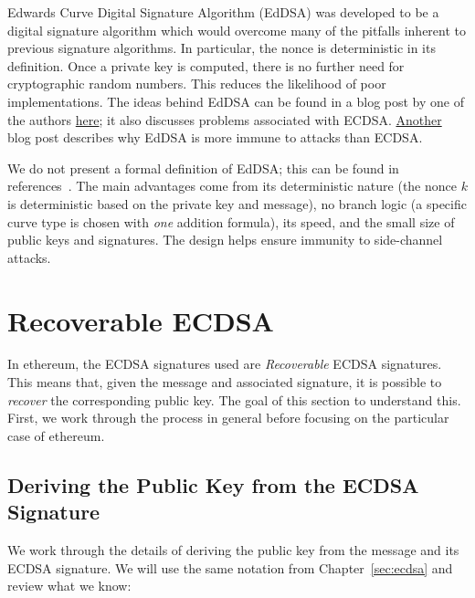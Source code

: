 Edwards Curve Digital Signature Algorithm (EdDSA)
was developed to be a digital signature algorithm which would
overcome many of the pitfalls inherent to previous signature algorithms.
In particular, the \gls{nonce} is deterministic in its definition.
Once a private key is computed, there is no further need
for cryptographic random numbers.
This reduces the likelihood of poor implementations.
The ideas behind EdDSA can be found in a blog post by one of the authors
\href{https://blog.cr.yp.to/20140323-ecdsa.html}{here};
it also discusses problems associated with ECDSA.
\href{https://blog.cr.yp.to/20191024-eddsa.html}{Another}
blog post describes why EdDSA is more immune to attacks than ECDSA.

We do not present a formal definition of EdDSA;
this can be found in references~\cite{ed25519,moreEdDSA,rfc8032}.
The main advantages come from its deterministic nature
(the \gls{nonce} $k$ is deterministic based on the private key and message),
no branch logic (a specific curve type is chosen with \emph{one}
addition formula),
its speed, and the small size of public keys and signatures.
The design helps ensure immunity to side-channel attacks.



\section{Recoverable ECDSA}
\label{sec:recoverable_ecdsa}

In \gls{ethereum}, the ECDSA signatures used are \emph{Recoverable}
ECDSA signatures.
This means that, given the message and associated signature,
it is possible to \emph{recover} the corresponding public key.
The goal of this section to understand this.
First, we work through the process in general before focusing
on the particular case of \gls{ethereum}.

\subsection{Deriving the Public Key from the ECDSA Signature}

We work through the details of deriving the public key from
the message and its ECDSA signature.
We will use the same notation from Chapter~\ref{sec:ecdsa}
and review what we know:

